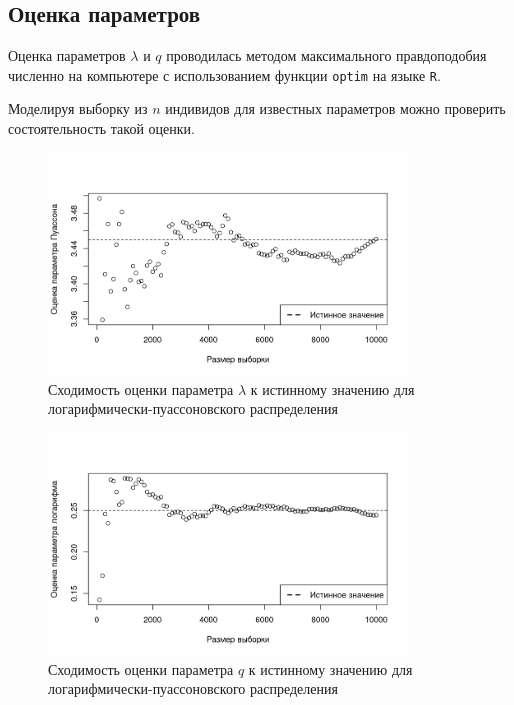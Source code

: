 \documentclass[12pt, specialist, subf, substylefile = spbu_report.rtx]{disser}
\begin{document}
	\subsection{Оценка параметров}
	
	Оценка параметров $\lambda$ и $q$ проводилась методом максимального правдоподобия численно на компьютере с использованием функции \verb|optim| на языке \verb|R|.
	
	Моделируя выборку из $n$ индивидов для известных параметров можно проверить состоятельность такой оценки.
	
	\begin{figure}[ht]
		\centering
		\includegraphics[width = 0.85\textwidth]{logpoislambda}
		\caption{Сходимость оценки параметра $\lambda$ к истинному значению для логарифмически-пуассоновского распределения}
		\label{img:logpoislambda}
	\end{figure}

	\begin{figure}[!ht]
		\centering
		\includegraphics[width = 0.85\textwidth]{logpoisq}
		\caption{Сходимость оценки параметра $q$ к истинному значению для логарифмически-пуассоновского распределения}
		\label{img:logpoisq}
	\end{figure}
\end{document}
